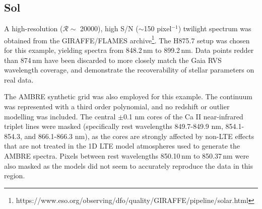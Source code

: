 \documentclass{aastex}
\begin{document}
\subsection{Sol}
\label{sec:sun}
A high-resolution ($\mathcal{R} \sim$ 20000), high S/N ($\sim{}$150 pixel$^{-1}$) twilight spectrum was obtained from the GIRAFFE/FLAMES archive\footnote{https://www.eso.org/observing/dfo/quality/GIRAFFE/pipeline/solar.html}. The H875.7 setup was chosen for this example, yielding spectra from 848.2\,nm to 899.2\,nm. Data points redder than 874\,nm have been discarded to more closely match the Gaia RVS wavelength coverage, and demonstrate the recoverability of stellar parameters on real data.

The AMBRE \citep{ambre} synthetic grid was also employed for this example. The continuum was represented with a third order polynomial, and no redshift or outlier modelling was included. The central $\pm$0.1 nm cores of the Ca II near-infrared triplet lines were masked (specifically rest wavelengths 849.7-849.9 nm, 854.1-854.3, and 866.1-866.3 nm), as the cores are strongly affected by non-LTE effects that are not treated in the 1D LTE model atmospheres used to generate the AMBRE spectra. Pixels between rest wavelengths 850.10\,nm to 850.37\,nm were also masked as the models did not seem to accurately reproduce the data in this region. 
\end{document}
